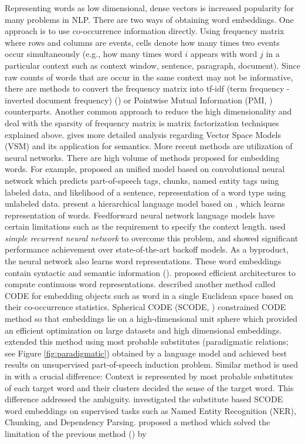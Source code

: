 Representing words as low dimensional, dense vectors is increased popularity for many problems in NLP. There are two ways of obtaining word embeddings. One approach is to use co-occurrence information directly. Using frequency matrix where rows and columns are events, cells denote how many times two events occur simultaneously (e.g., how many times word $i$ appears with word $j$ in a particular context such as context window, sentence, paragraph, document). Since raw counts of words that are occur in the same context may not be informative, there are methods to convert the frequency matrix into tf-idf (term frequency - inverted document frequency) (\cite{sparck1972statistical}) or Pointwise Mutual Information (PMI, \cite{church1990word}) counterparts. Another common approach to reduce the high dimensionality and deal with the sparsity of frequency matrix is matrix factorization techniques explained above. \cite{turney10frequency} gives more detailed analysis regarding Vector Space Models (VSM) and its application for semantics. More recent methods are utilization of neural networks. There are high volume of methods proposed for embedding words. For example, \cite{collobert2008unified} proposed an unified model based on convolutional neural network which predicts part-of-speech tags, chunks, named entity tags using labeled data, and likelihood of a sentence, representation of a word type using unlabeled data. \cite{mnih2009scalable} present a hierarchical language model based on \cite{morin2005hierarchical}, which learns representation of words. Feedforward neural network language models have certain limitations such as the requirement to specify the context length. \cite{mikolov2010recurrent} used \emph{simple recurrent neural network} to overcome this problem, and showed significant performance achievement over state-of-the-art backoff models. As a byproduct, the neural network also learns word representations. These word embeddings contain syntactic and semantic information (\cite{mikolov2013linguistic}). \cite{mikolov2013efficient} proposed efficient architectures to compute continuous word representations. \cite{globerson2004euclidean} described another method called CODE for embedding objects such as word in a single Euclidean space based on their co-occurrence statistics. Spherical CODE (SCODE, \cite{Maron2010}) constrained CODE method so that embeddings lie on a high-dimensional unit sphere which provided an efficient optimization on large datasets and high dimensional embeddings. \cite{yatbaz2012learning} extended this method using most probable substitutes (paradigmatic relations; see Figure \ref{fig:paradigmatic}) obtained by a language model and achieved best results on unsupervised part-of-speech induction problem. Similar method is used in \cite{baskaya13ai} with a crucial difference: Context is represented by most probable substitutes of each target word and their clusters decided the sense of the target word. This difference addressed the ambiguity. \cite{cirik2014substitute} investigated the substitute based SCODE word embeddings on supervised tasks such as Named Entity Recognition (NER), Chunking, and Dependency Parsing. \cite{yatbaz2014unsupervised} proposed a method which solved the limitation of the previous method (\cite{yatbaz2012learning}) by 